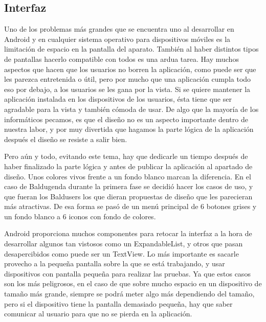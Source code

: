 \subsection{Interfaz}
\label{subsecc:Interfaz}

Uno de los problemas más grandes que se encuentra uno al desarrollar en Android y en cualquier sistema operativo para dispositivos móviles es la limitación de espacio en la pantalla del aparato. También al haber distintos tipos de pantallas hacerlo compatible con todos es una ardua tarea.
Hay muchos aspectos que hacen que los usuarios no borren la aplicación, como puede ser que les parezca entretenida o útil, pero por mucho que una aplicación cumpla todo eso por debajo, a los usuarios se les gana por la vista. Si se quiere mantener la aplicación instalada en los dispositivos de los usuarios, ésta tiene que ser agradable para la vista y también cómoda de usar.
De algo que la mayoría de los informáticos pecamos, es que el diseño no es un aspecto importante dentro de nuestra labor, y por muy divertida que hagamos la parte lógica de la aplicación después el diseño se resiste a salir bien.

Pero aún y todo, evitando este tema, hay que dedicarle un tiempo después de haber finalizado la parte lógica y antes de publicar la aplicación al apartado de diseño.
Unos colores vivos frente a un fondo blanco marcan la diferencia.
En el caso de Baldugenda durante la primera fase se decidió hacer los casos de uso, y que fueran los Baldusers los que dieran propuestas de diseño que les parecieran más atractivas.
De esa forma se pasó de un menú principal de 6 botones grises y un fondo blanco a 6 iconos con fondo de colores.

Android proporciona muchos componentes para retocar la interfaz a la hora de desarrollar algunos tan vistosos como un ExpandableList, y otros que pasan desapercibidos como puede ser un TextView.
Lo más importante es sacarle provecho a la pequeña pantalla sobre la que se está trabajando, y usar dispositivos con pantalla pequeña para realizar las pruebas. Ya que estos casos son los más peligrosos, en el caso de que sobre mucho espacio en un dispositivo de tamaño más grande, siempre se podrá meter algo más dependiendo del tamaño, pero si el dispositivo tiene la pantalla demasiado pequeña, hay que saber comunicar al usuario para que no se pierda en la aplicación.

